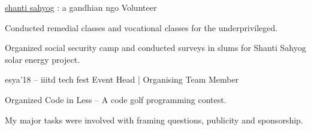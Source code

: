 

\begin{cventries}
  \cventry
    {\href{https://shantisahyog.org/}{shanti sahyog} : a gandhian ngo} %
    {Volunteer} %
    {} %
    {} %
    {
      \begin{cvitems}
            \item {Conducted remedial classes and vocational classes for the underprivileged.}
            \item {Organized social security camp and conducted surveys in slums for Shanti Sahyog solar energy project.}
        \end{cvitems}
    }
    {}

  \cventry
    {esya’18 – iiitd tech fest} %
    {Event Head | Organising Team Member} %
    {} %
    {} %
    {
      \begin{cvitems}
        \item {Organized Code in Less – A code golf programming contest.}
        \item {My major tasks were involved with framing questions, publicity and sponsorship.}
      \end{cvitems}
    }
    {}

\end{cventries}
